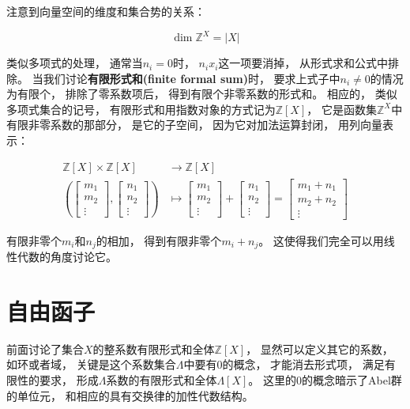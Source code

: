 \documentclass[10pt, openany]{book}
\begin{document}
注意到向量空间的维度和集合势的关系：

\begin{equation}
\dim \mathbb Z^X = |X|
\end{equation}\label{eq:dim-card-Z}

类似多项式的处理，
通常当$n_i=0$时，
$n_i x_i$这一项要消掉，
从形式求和公式中排除。
当我们讨论\textbf{有限形式和(finite formal sum)}时，
要求上式子中$n_i \neq 0$的情况为有限个，
排除了零系数项后，
得到有限个非零系数的形式和。
相应的，
类似多项式集合的记号，
有限形式和用指数对象的方式记为$\mathbb Z[X]$，
它是函数集$\mathbb Z^X$中有限非零系数的那部分，
是它的子空间，
因为它对加法运算封闭，
用列向量表示：

$$
\begin{aligned}
\mathbb Z[X] \times \mathbb Z[X] &\to \mathbb Z[X] \\    
\left(
    \begin{bmatrix} m_1 \\ m_2 \\ \vdots \end{bmatrix},
    \begin{bmatrix} n_1 \\ n_2 \\ \vdots \end{bmatrix}
\right) 
&\mapsto
    \begin{bmatrix} m_1 \\ m_2 \\ \vdots \end{bmatrix} +
    \begin{bmatrix} n_1 \\ n_2 \\ \vdots \end{bmatrix}
    = \begin{bmatrix} m_1 + n_1 \\ m_2 + n_2 \\ \vdots \end{bmatrix}
\end{aligned}
$$

有限非零个$m_i$和$n_j$的相加，
得到有限非零个$m_i + n_j$。
这使得我们完全可以用线性代数的角度讨论它。

\section{自由函子}

前面讨论了集合$X$的整系数有限形式和全体$\mathbb Z[X]$，
显然可以定义其它的系数，
如环或者域，
关键是这个系数集合$\Lambda$中要有$0$的概念，
才能消去形式项，
满足有限性的要求，
形成$\Lambda$系数的有限形式和全体$\Lambda[X]$。
这里的$0$的概念暗示了Abel群的单位元，
和相应的具有交换律的加性代数结构。
\end{document}
